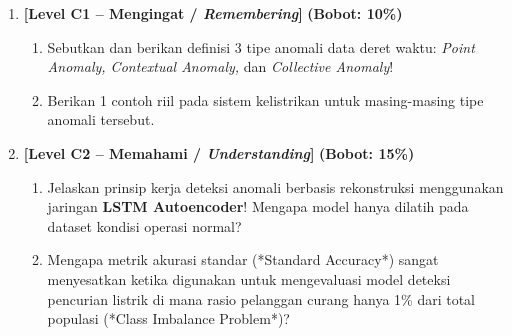\documentclass[11pt,a4paper]{article}
\begin{document}
\begin{enumerate}[leftmargin=1.5em, label=\textbf{Soal \arabic*.}]

    \item \textbf{[Level C1 -- Mengingat / \textit{Remembering}]} \hfill \textbf{(Bobot: 10\%)}
    \begin{enumerate}[label=\alph*.]
        \item Sebutkan dan berikan definisi 3 tipe anomali data deret waktu: \textit{Point Anomaly, Contextual Anomaly,} dan \textit{Collective Anomaly}!
        \item Berikan 1 contoh riil pada sistem kelistrikan untuk masing-masing tipe anomali tersebut.
    \end{enumerate}

    \vspace{0.3cm}

    \item \textbf{[Level C2 -- Memahami / \textit{Understanding}]} \hfill \textbf{(Bobot: 15\%)}
    \begin{enumerate}[label=\alph*.]
        \item Jelaskan prinsip kerja deteksi anomali berbasis rekonstruksi menggunakan jaringan \textbf{LSTM Autoencoder}! Mengapa model hanya dilatih pada dataset kondisi operasi normal?
        \item Mengapa metrik akurasi standar (*Standard Accuracy*) sangat menyesatkan ketika digunakan untuk mengevaluasi model deteksi pencurian listrik di mana rasio pelanggan curang hanya 1\% dari total populasi (*Class Imbalance Problem*)?
    \end{enumerate}

    \vspace{0.3cm}


\end{enumerate}
\end{document}
